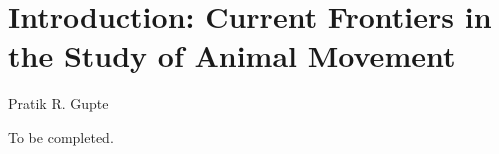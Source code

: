 
{}%
\chapter{Introduction: Current Frontiers in the Study of Animal Movement}\label{ch:introduction}

{{Pratik R. Gupte}}




To be completed.

\vfill

{\centering{}}

\clearpage
